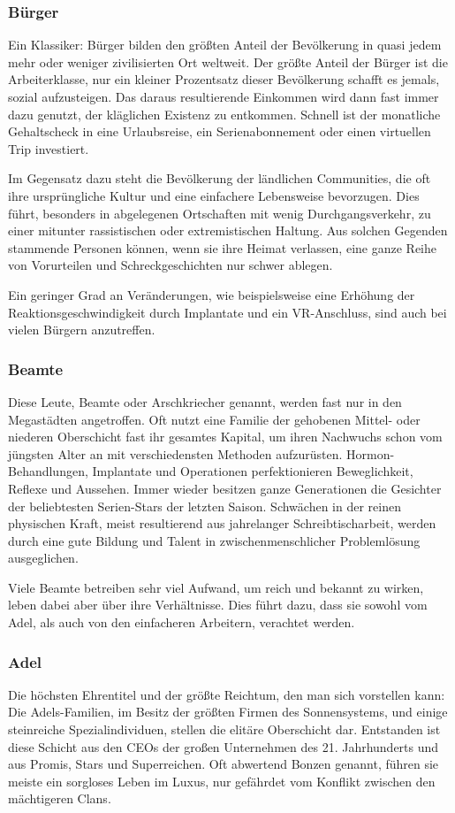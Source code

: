 \subsubsection{Bürger}
Ein Klassiker: Bürger bilden den größten Anteil der Bevölkerung in quasi jedem mehr oder weniger zivilisierten Ort weltweit. Der größte Anteil der Bürger ist die Arbeiterklasse, nur ein kleiner Prozentsatz dieser Bevölkerung schafft es jemals, sozial aufzusteigen. Das daraus resultierende Einkommen wird dann fast immer dazu genutzt, der kläglichen Existenz zu entkommen. Schnell ist der monatliche Gehaltscheck in eine Urlaubsreise, ein Serienabonnement oder einen virtuellen Trip investiert.

Im Gegensatz dazu steht die Bevölkerung der ländlichen Communities, die oft ihre ursprüngliche Kultur und eine einfachere Lebensweise bevorzugen. Dies führt, besonders in abgelegenen Ortschaften mit wenig Durchgangsverkehr, zu einer mitunter rassistischen oder extremistischen Haltung. Aus solchen Gegenden stammende Personen können, wenn sie ihre Heimat verlassen, eine ganze Reihe von Vorurteilen und Schreckgeschichten nur schwer ablegen.

Ein geringer Grad an Veränderungen, wie beispielsweise eine Erhöhung der Reaktionsgeschwindigkeit durch Implantate und ein VR-Anschluss, sind auch bei vielen Bürgern anzutreffen.
\subsubsection{Beamte}
Diese Leute, \glqq Beamte\grqq{} oder \glqq Arschkriecher\grqq{} genannt, werden fast nur in den Megastädten angetroffen. Oft nutzt eine Familie der gehobenen Mittel- oder niederen Oberschicht fast ihr gesamtes Kapital, um ihren Nachwuchs schon vom jüngsten Alter an mit verschiedensten Methoden aufzurüsten. Hormon-Behandlungen, Implantate und Operationen perfektionieren Beweglichkeit, Reflexe und Aussehen. Immer wieder besitzen ganze Generationen die Gesichter der beliebtesten Serien-Stars der letzten Saison. Schwächen in der reinen physischen Kraft, meist resultierend aus jahrelanger Schreibtischarbeit, werden durch eine gute Bildung und Talent in \glqq zwischenmenschlicher Problemlösung\grqq{}  ausgeglichen.

Viele Beamte betreiben sehr viel Aufwand, um reich und bekannt zu wirken, leben dabei aber über ihre Verhältnisse. Dies führt dazu, dass sie sowohl vom Adel, als auch von den einfacheren Arbeitern, verachtet werden.
\subsubsection{Adel}
Die höchsten Ehrentitel und der größte Reichtum, den man sich vorstellen kann: Die Adels-Familien, im Besitz der größten Firmen des Sonnensystems, und einige steinreiche Spezialindividuen, stellen die elitäre Oberschicht dar. Entstanden ist diese Schicht aus den CEOs der großen Unternehmen des 21. Jahrhunderts und aus Promis, Stars und Superreichen. Oft abwertend \glqq Bonzen\grqq{} genannt, führen sie meiste ein sorgloses Leben im Luxus, nur gefährdet vom Konflikt zwischen den mächtigeren Clans.

